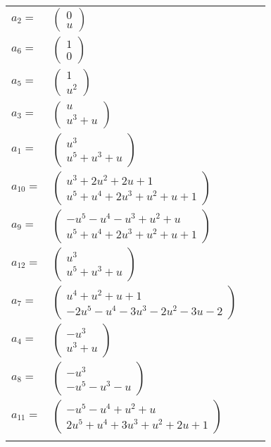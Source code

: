 \documentclass[1p]{elsarticle_modified}
\theoremstyle{definition}
\begin{document}
\begin{tabular}{m{7pt} m{180pt} m{7pt} m{180pt} }
\flushright $a_{2}=$&$\begin{pmatrix}0\\u\end{pmatrix}$ \\
\flushright $a_{6}=$&$\begin{pmatrix}1\\0\end{pmatrix}$ \\
\flushright $a_{5}=$&$\begin{pmatrix}1\\u^2\end{pmatrix}$ \\
\flushright $a_{3}=$&$\begin{pmatrix}u\\u^3+u\end{pmatrix}$ \\
\flushright $a_{1}=$&$\begin{pmatrix}u^3\\u^5+u^3+u\end{pmatrix}$ \\
\flushright $a_{10}=$&$\begin{pmatrix}u^3+2 u^2+2 u+1\\u^5+u^4+2 u^3+u^2+u+1\end{pmatrix}$ \\
\flushright $a_{9}=$&$\begin{pmatrix}- u^5- u^4- u^3+u^2+u\\u^5+u^4+2 u^3+u^2+u+1\end{pmatrix}$ \\
\flushright $a_{12}=$&$\begin{pmatrix}u^3\\u^5+u^3+u\end{pmatrix}$ \\
\flushright $a_{7}=$&$\begin{pmatrix}u^4+u^2+u+1\\-2 u^5- u^4-3 u^3-2 u^2-3 u-2\end{pmatrix}$ \\
\flushright $a_{4}=$&$\begin{pmatrix}- u^3\\u^3+u\end{pmatrix}$ \\
\flushright $a_{8}=$&$\begin{pmatrix}- u^3\\- u^5- u^3- u\end{pmatrix}$ \\
\flushright $a_{11}=$&$\begin{pmatrix}- u^5- u^4+u^2+u\\2 u^5+u^4+3 u^3+u^2+2 u+1\end{pmatrix}$\\&\end{tabular}
\end{document}
